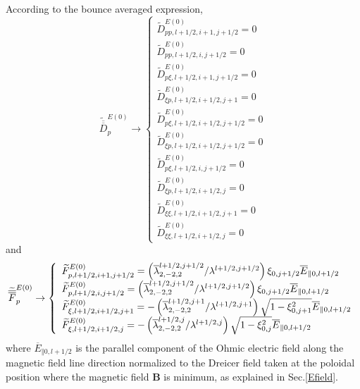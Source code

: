 According to the bounce averaged expression,
\begin{equation}
\widetilde{\overline{\overline{D}}}_{p}^{E\left( 0\right) }\rightarrow
\left\{
\begin{array}{l}
\widetilde{D}_{pp,l+1/2,i+1,j+1/2}^{E\left( 0\right) }=0 \\
\widetilde{D}_{pp,l+1/2,i,j+1/2}^{E\left( 0\right) }=0 \\
\widetilde{D}_{p\xi ,l+1/2,i+1,j+1/2}^{E\left( 0\right) }=0 \\
\widetilde{D}_{\xi p,l+1/2,i+1/2,j+1}^{E\left( 0\right) }=0 \\
\widetilde{D}_{p\xi ,l+1/2,i+1/2,j+1/2}^{E\left( 0\right) }=0 \\
\widetilde{D}_{\xi p,l+1/2,i+1/2,j+1/2}^{E\left( 0\right) }=0 \\
\widetilde{D}_{p\xi ,l+1/2,i,j+1/2}^{E\left( 0\right) }=0 \\
\widetilde{D}_{\xi p,l+1/2,i+1/2,j}^{E\left( 0\right) }=0 \\
\widetilde{D}_{\xi \xi ,l+1/2,i+1/2,j+1}^{E\left( 0\right) }=0 \\
\widetilde{D}_{\xi \xi ,l+1/2,i+1/2,j}^{E\left( 0\right) }=0
\end{array}
\right.
\end{equation}
and
\begin{equation}
\widetilde{\overline{\overline{F}}}_{p}^{E\left( 0\right) }\rightarrow
\left\{
\begin{array}{l}
\widetilde{F}_{p,l+1/2,i+1,j+1/2}^{E\left( 0\right) }=\left( \overline{%
\lambda }_{2,-2,2}^{l+1/2,j+1/2}/\lambda ^{l+1/2,j+1/2}\right) \xi _{0,j+1/2}%
\overline{E}_{\Vert 0,l+1/2} \\
\widetilde{F}_{p,l+1/2,i,j+1/2}^{E\left( 0\right) }=\left( \overline{\lambda
}_{2,-2,2}^{l+1/2,j+1/2}/\lambda ^{l+1/2,j+1/2}\right) \xi _{0,j+1/2}%
\overline{E}_{\Vert 0,l+1/2} \\
\widetilde{F}_{\xi ,l+1/2,i+1/2,j+1}^{E\left( 0\right) }=-\left( \overline{%
\lambda }_{2,-2,2}^{l+1/2,j+1}/\lambda ^{l+1/2,j+1}\right) \sqrt{1-\xi
_{0,j+1}^{2}}\overline{E}_{\Vert 0,l+1/2} \\
\widetilde{F}_{\xi ,l+1/2,i+1/2,j}^{E\left( 0\right) }=-\left( \overline{%
\lambda }_{2,-2,2}^{l+1/2,j}/\lambda ^{l+1/2,j}\right) \sqrt{1-\xi _{0,j}^{2}%
}\overline{E}_{\Vert 0,l+1/2}
\end{array}
\right.
\end{equation}
where $\overline{E}_{\Vert 0,l+1/2}$ is the parallel component of the Ohmic
electric field along the magnetic field line direction normalized to the
Dreicer field taken at the poloidal position where the magnetic field $%
\mathbf{B}$ is minimum, as explained in Sec.\ref{Efield}.

